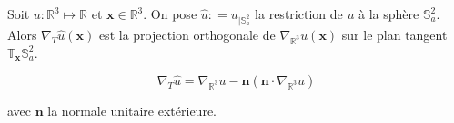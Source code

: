 \begin{proposition}
Soit $u: \mathbb{R}^3 \mapsto \mathbb{R}$ et $\mathbf{x} \in \mathbb{R}^3$. On pose $\hat{u} : = u_{|\mathbb{S}_a^2}$ la restriction de $u$ à la sphère $\mathbb{S}_a^2$. Alors $\nabla_{T} \hat{u} (\mathbf{x})$ est la projection orthogonale de $\nabla_{\mathbb{R}^3} u (\mathbf{x})$ sur le plan tangent $\mathbb{T}_{\mathbf{x}} \mathbb{S}_a^2$.

\begin{equation}
\nabla_T \hat{u} = \nabla_{\mathbb{R}^3} u - \mathbf{n} \left( \mathbf{n} \cdot \nabla_{\mathbb{R}^3} u \right)
\end{equation}

avec $\mathbf{n}$ la normale unitaire extérieure.
\label{prop:gradient_project}
\end{proposition}

